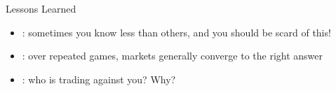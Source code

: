 Lessons Learned
\begin{itemize}
    \item {}: sometimes you know less than others, and you should be scard of this!
    \item {}: over repeated games, markets generally converge to the right answer
    \item {}: who is trading against you? Why?
\end{itemize}


